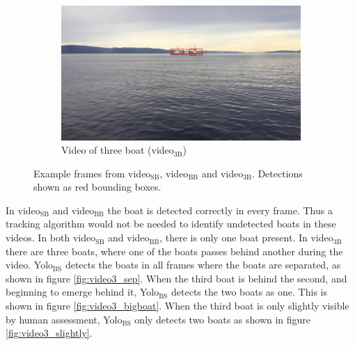 \begin{figure}[h!]
\begin{subfigure}[b]{0.78\textwidth}
   \includegraphics[width=1\linewidth]{results/video/video3/frame20.jpg}
   \caption{Video of three boat (video$_{\text{3B}}$)}
   \label{fig:video3}
\end{subfigure}
\caption{Example frames from video$_{\text{SB}}$, video$_{\text{BB}}$ and video$_{\text{3B}}$. Detections shown as red bounding boxes.}
\label{fig:videos}
\end{figure}

\newpage
\noindent
In video$_{\text{SB}}$ and video$_{\text{BB}}$ the boat is detected correctly in every frame. Thus a tracking algorithm would not be needed to identify undetected boats in these videos. In both video$_{\text{SB}}$ and video$_{\text{BB}}$, there is only one boat present. In video$_{\text{3B}}$ there are three boats, where one of the boats passes behind another during the video. Yolo$_{\text{BS}}$ detects the boats in all frames where the boats are separated, as shown in figure \ref{fig:video3_sep}. When the third boat is behind the second, and beginning to emerge behind it, Yolo$_{\text{BS}}$ detects the two boats as one. This is shown in figure \ref{fig:video3_bigboat}. When the third boat is only slightly visible by human assessment, Yolo$_{\text{BS}}$ only detects two boats as shown in figure \ref{fig:video3_slightly}. 


